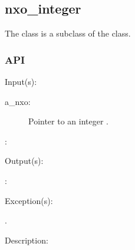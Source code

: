 %
%
%
%
%              

\subsection{nxo\_integer}
\label{nxo_integer}

The  class is a subclass of the  class.

\subsubsection{API}
\begin{capi}
\label{nxo_integer_}
	\begin{capilist}
	\item[Input(s): ]
		\begin{description}\item[]
		\item[a\_nxo: ]
			Pointer to an integer .
		\item[: ]
		\end{description}
	\item[Output(s): ]
		\begin{description}\item[]
		\item[: ]
		\end{description}
	\item[Exception(s): ]
		\begin{description}\item[]
		\item[.]
		\end{description}
	\item[Description: ]
	\end{capilist}
\end{capi}
